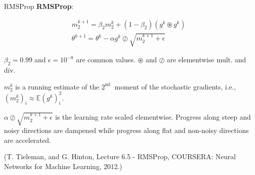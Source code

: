 \begin{frame}[allowframebreaks]

\begin{mydefinitionblock}{6.20}{RMSProp}
    \textbf{RMSProp}:

    $$
    \begin{gathered}
    m_{2}^{k+1}=\beta_{2} m_{2}^{k}+\left(1-\beta_{2}\right)\left(g^{k} \circledast g^{k}\right) \\
    \theta^{k+1}=\theta^{k}-\alpha g^{k} \oslash \sqrt{m_{2}^{k+1}+\epsilon}
    \end{gathered}
    $$

    $\beta_{2}=0.99$ and $\epsilon=10^{-8}$ are common values. $\circledast$ and $\oslash$ are elementwise mult. and div.

    $m_{2}^{k}$ is a running estimate of the $2^{\text {nd }}$ moment of the stochastic gradients, i.e., $\left(m_{2}^{k}\right)_{i} \approx \mathbb{E}\left(g^{k}\right)_{i}^{2}$.

    $\alpha \oslash \sqrt{m_{2}^{k+1}+\epsilon}$ is the learning rate scaled elementwise. Progress along steep and noisy directions are dampened while progress along flat and non-noisy directions are accelerated.

    (T. Tieleman, and G. Hinton, Lecture 6.5 - RMSProp, COURSERA: Neural Networks for Machine Learning, 2012.)
\end{mydefinitionblock}

\end{frame}

